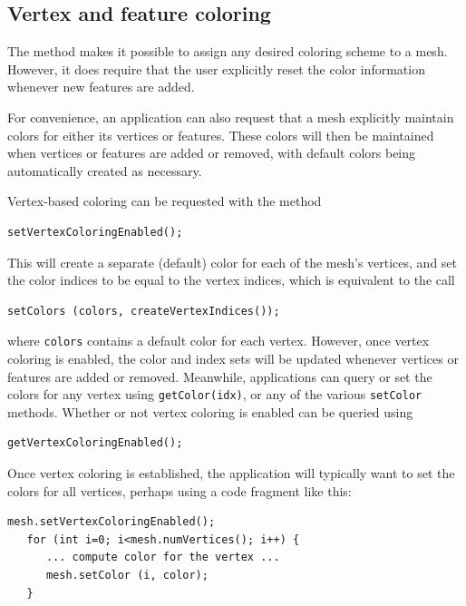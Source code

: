 \subsection{Vertex and feature coloring}
\label{vertexAndFeatureColoring:sec}

The method  makes
it possible to assign any desired coloring scheme to a mesh. However,
it does require that the user explicitly reset the color information
whenever new features are added.

For convenience, an application can also request that a mesh
explicitly maintain colors for either its vertices or features.  These
colors will then be maintained when vertices or features are added or
removed, with default colors being automatically created as necessary.

Vertex-based coloring can be requested with the method
\begin{lstlisting}[]
   setVertexColoringEnabled();
\end{lstlisting}
%
This will create a separate (default) color for each of the mesh's
vertices, and set the color indices to be equal to the vertex indices,
which is equivalent to the call
%
\begin{lstlisting}[]
   setColors (colors, createVertexIndices());
\end{lstlisting}
%
where {\tt colors} contains a default color for each
vertex. However, once vertex coloring is enabled, the color and index
sets will be updated whenever vertices or features are added or
removed. Meanwhile, applications can query or set the colors
for any vertex using {\tt getColor(idx)}, or any of the
various {\tt setColor} methods.
Whether or not vertex coloring
is enabled can be queried using
\begin{lstlisting}[]
   getVertexColoringEnabled();
\end{lstlisting}
%
Once vertex coloring is established, the application will typically
want to set the colors for all vertices, perhaps using a code fragment
like this:
%
\begin{lstlisting}[]
   mesh.setVertexColoringEnabled();
   for (int i=0; i<mesh.numVertices(); i++) {
      ... compute color for the vertex ...
      mesh.setColor (i, color);
   }
\end{lstlisting}
%

